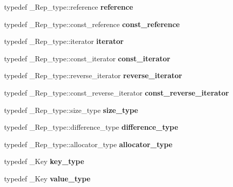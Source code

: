 \begin{DoxyCompactItemize}
typedef \+\_\+\+Rep\+\_\+type\+::reference {\bfseries reference}
\item 
\mbox{\label{classmultiset_aa7bd1acd1400291499edb99a0e8fb7fe}} 
typedef \+\_\+\+Rep\+\_\+type\+::const\+\_\+reference {\bfseries const\+\_\+reference}
\item 
\mbox{\label{classmultiset_ac696cdc877835179ff74e9b7e02e63b9}} 
typedef \+\_\+\+Rep\+\_\+type\+::iterator {\bfseries iterator}
\item 
\mbox{\label{classmultiset_afcab55504054cf340408266ec50bc33b}} 
typedef \+\_\+\+Rep\+\_\+type\+::const\+\_\+iterator {\bfseries const\+\_\+iterator}
\item 
\mbox{\label{classmultiset_ab4d601faedc0a955ebf489a93cdd9dd1}} 
typedef \+\_\+\+Rep\+\_\+type\+::reverse\+\_\+iterator {\bfseries reverse\+\_\+iterator}
\item 
\mbox{\label{classmultiset_a5953e186d84ff7aa18cc84dea600ce53}} 
typedef \+\_\+\+Rep\+\_\+type\+::const\+\_\+reverse\+\_\+iterator {\bfseries const\+\_\+reverse\+\_\+iterator}
\item 
\mbox{\label{classmultiset_a204cb5051aaac0e9269e6c31ad04cad7}} 
typedef \+\_\+\+Rep\+\_\+type\+::size\+\_\+type {\bfseries size\+\_\+type}
\item 
\mbox{\label{classmultiset_a2e987cd850d529702cd11fed5995ead5}} 
typedef \+\_\+\+Rep\+\_\+type\+::difference\+\_\+type {\bfseries difference\+\_\+type}
\item 
\mbox{\label{classmultiset_a6335c4cda8712404693f9900ad404916}} 
typedef \+\_\+\+Rep\+\_\+type\+::allocator\+\_\+type {\bfseries allocator\+\_\+type}
\item 
\mbox{\label{classmultiset_a965b3049a0b8b4194a7c79707e3c51d7}} 
typedef \+\_\+\+Key {\bfseries key\+\_\+type}
\item 
\mbox{\label{classmultiset_a6e7f960d58c0465446f09d706da17521}} 
typedef \+\_\+\+Key {\bfseries value\+\_\+type}
\item 

\end{DoxyCompactItemize}
